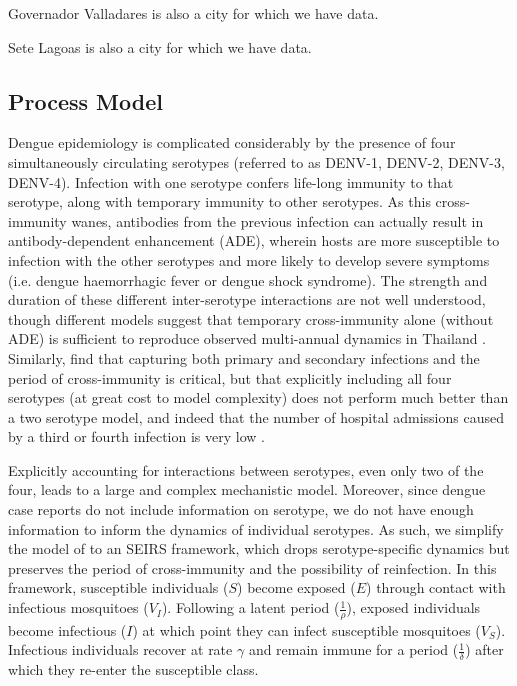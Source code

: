 \documentclass[10pt,letterpaper]{article}
\begin{document}
Governador Valladares is also a city for which we have data.

Sete Lagoas is also a city for which we have data.


\subsection*{Process Model}

Dengue epidemiology is complicated considerably by the presence of four simultaneously circulating serotypes (referred to as DENV-1, DENV-2, DENV-3, DENV-4).
Infection with one serotype confers life-long immunity to that serotype, along with temporary immunity to other serotypes.  
As this cross-immunity wanes, antibodies from the previous infection can actually result in antibody-dependent enhancement (ADE), wherein hosts are more susceptible to infection with the other serotypes and more likely to develop severe symptoms (i.e. dengue haemorrhagic fever or dengue shock syndrome).
The strength and duration of these different inter-serotype interactions are not well understood, though different models suggest that temporary cross-immunity alone (without ADE) is sufficient to reproduce observed multi-annual dynamics in Thailand \cite{Wearing2006,Reich2013}.
Similarly, \cite{Aguiar2013} find that capturing both primary and secondary infections and the period of cross-immunity is critical, but that explicitly including all four serotypes (at great cost to model complexity) does not perform much better than a two serotype model, and indeed that the number of hospital admissions caused by a third or fourth infection is very low \cite{Aguiar2011a}.

Explicitly accounting for interactions between serotypes, even only two of the four, leads to a large and complex mechanistic model.
Moreover, since dengue case reports do not include information on serotype, we do not have enough information to inform the dynamics of individual serotypes.
As such, we simplify the model of \cite{Wearing2006} to an SEIRS framework, which drops serotype-specific dynamics but preserves the period of cross-immunity and the possibility of reinfection.
In this framework, susceptible individuals ($S$) become exposed ($E$) through contact with infectious mosquitoes ($V_I$).
Following a latent period ($\frac{1}{\rho}$), exposed individuals become infectious ($I$) at which point they can infect susceptible mosquitoes ($V_S$).
Infectious individuals recover at rate $\gamma$ and remain immune for a period ($\frac{1}{\delta}$) after which they re-enter the susceptible class.
\end{document}
